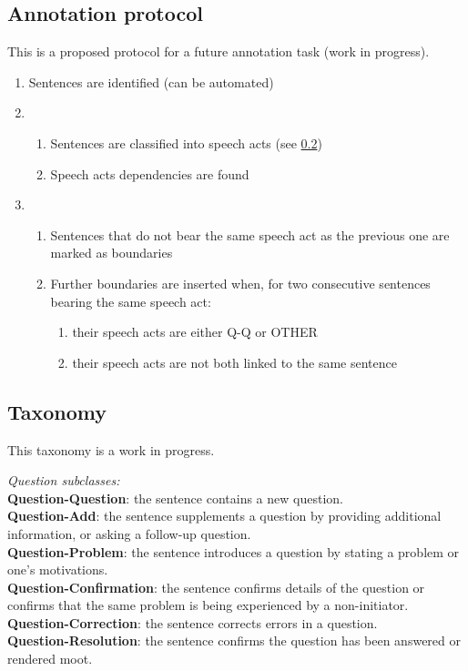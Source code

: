 \documentclass[11pt]{article}
\begin{document}
\subsection{Annotation protocol}

This is a proposed protocol for a future annotation task (work in progress).

\begin{enumerate}
	\item Sentences are identified (can be automated)
	\item 
		\begin{enumerate}
			\item Sentences are classified into speech acts (see \ref{sec:taxonomy})
			\item Speech acts dependencies are found
		\end{enumerate}
	\item 
		\begin{enumerate}
			\item Sentences that do not bear the same speech act as the previous one are marked as boundaries
			\item Further boundaries are inserted when, for two consecutive sentences bearing the same speech act:
				\begin{enumerate}
					\item their speech acts are either Q-Q or OTHER
					\item their speech acts are not both linked to the same sentence
				\end{enumerate}
		\end{enumerate}
\end{enumerate}

\subsection{Taxonomy}
\label{sec:taxonomy}

This taxonomy is a work in progress.\newline

\textit{Question subclasses:} \\
\textbf{Question-Question}: the sentence contains a new question. \\
\textbf{Question-Add}: the sentence supplements a question by providing additional information, or asking a follow-up question. \\
\textbf{Question-Problem}: the sentence introduces a question by stating a problem or one's motivations. \\
\textbf{Question-Confirmation}: the sentence confirms details of the question or confirms that the same problem is being experienced by a non-initiator. \\
\textbf{Question-Correction}: the sentence corrects errors in a question. \\
\textbf{Question-Resolution}: the sentence confirms the question has been answered or rendered moot. \\
\end{document}
